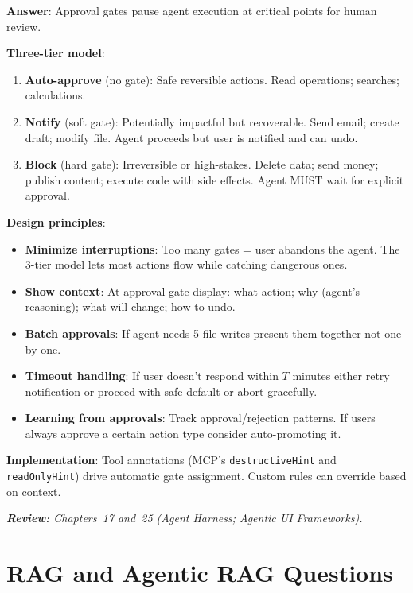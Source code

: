 \begin{questionbox}
\textbf{Answer}: Approval gates pause agent execution at critical points for human review.

\textbf{Three-tier model}:

\begin{enumerate}
  \item \textbf{Auto-approve} (no gate): Safe reversible actions. Read operations; searches; calculations.
  \item \textbf{Notify} (soft gate): Potentially impactful but recoverable. Send email; create draft; modify file. Agent proceeds but user is notified and can undo.
  \item \textbf{Block} (hard gate): Irreversible or high-stakes. Delete data; send money; publish content; execute code with side effects. Agent MUST wait for explicit approval.
\end{enumerate}

\textbf{Design principles}:

\begin{itemize}
  \item \textbf{Minimize interruptions}: Too many gates = user abandons the agent. The 3-tier model lets most actions flow while catching dangerous ones.
  \item \textbf{Show context}: At approval gate display: what action; why (agent’s reasoning); what will change; how to undo.
  \item \textbf{Batch approvals}: If agent needs 5 file writes present them together not one by one.
  \item \textbf{Timeout handling}: If user doesn’t respond within $T$ minutes either retry notification or proceed with safe default or abort gracefully.
  \item \textbf{Learning from approvals}: Track approval/rejection patterns. If users always approve a certain action type consider auto-promoting it.
\end{itemize}

\textbf{Implementation}: Tool annotations (MCP’s \texttt{destructiveHint} and \texttt{readOnlyHint}) drive automatic gate assignment. Custom rules can override based on context.

\emph{\textbf{Review:} Chapters~17 and~25 (Agent Harness; Agentic UI Frameworks).}
\end{questionbox}

\section{RAG and Agentic RAG Questions}
\label{rag-and-agentic-rag-questions}

